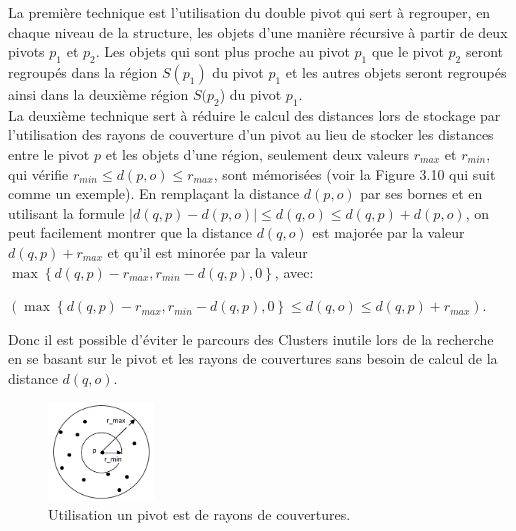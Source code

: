 La première technique est l’utilisation du double pivot qui sert à regrouper, en chaque niveau de la structure, les objets d’une manière récursive à partir de deux pivots $ p_1 $ et $ p_2 $. Les objets qui sont plus proche au pivot $ p_1 $ que le pivot $ p_2 $ seront regroupés dans la région $ S(p_1) $ du pivot $ p_1 $ et les autres objets seront regroupés ainsi dans la deuxième région $ S(p_2 $) du pivot $ p_1 $.\\

La deuxième technique sert à réduire le calcul des distances lors de stockage par l’utilisation des rayons de couverture d’un pivot au lieu de stocker les distances entre le pivot $ p $ et les objets d'une région, seulement deux valeurs $ r_{max} $ et $ r_{min} $, qui vérifie $  r_{min}  \le d(p,o) \le r_{max}  $, sont mémorisées (voir la Figure 3.10 qui suit comme un exemple). En remplaçant la distance $ d(p,o) $ par ses bornes et en utilisant la formule $ |d(q,p)-d(p,o)| \le d(q,o) \le d(q,p)+d(p,o) $, on peut facilement montrer que la distance $ d(q,o) $ est majorée par la valeur $ d(q,p) + r_{max} $ et qu’il est minorée par la valeur
$ \max \left\{d(q,p) - r_{max}, r_{min} - d(q,p), 0\right\} $,
avec:
\begin{center}
	$  ( \max \left\{ d(q,p) - r_{max} , r_{min} - d(q,p), 0\right\} \le d(q,o) \le d(q,p) + r_{max} ) $.
\end{center}
 Donc il est possible d’éviter le parcours des Clusters inutile lors de la recherche en se basant sur le pivot et les rayons de couvertures sans besoin de calcul de la distance $ d(q,o) $.
\begin{figure}[H]
	\centering
	\includegraphics[width=0.25\textwidth]{Figures/radius.png} %
	\caption{Utilisation un pivot est de rayons de couvertures.}
\end{figure}

